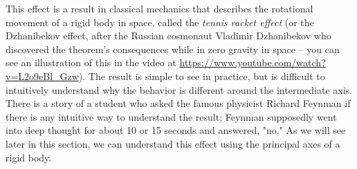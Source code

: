 This effect is a result in classical mechanics that describes the rotational movement of a rigid body in space, called the \emph{tennis racket effect} (or the Dzhanibekov effect, after the Russian cosmonaut Vladimir Dzhanibekov who discovered the theorem's consequences while in zero gravity in space -- you can see an illustration of this in the video at \url{https://www.youtube.com/watch?v=L2o9eBl_Gzw}). The result is simple to see in practice, but is difficult to intuitively understand why the behavior is different around the intermediate axis. There is a story of a student who asked the famous physicist Richard Feynman if there is any intuitive way to understand the result; Feynman supposedly went into deep thought for about 10 or 15 seconds and answered, "no." As we will see later in this section, we can understand this effect using the principal axes of a rigid body. 


